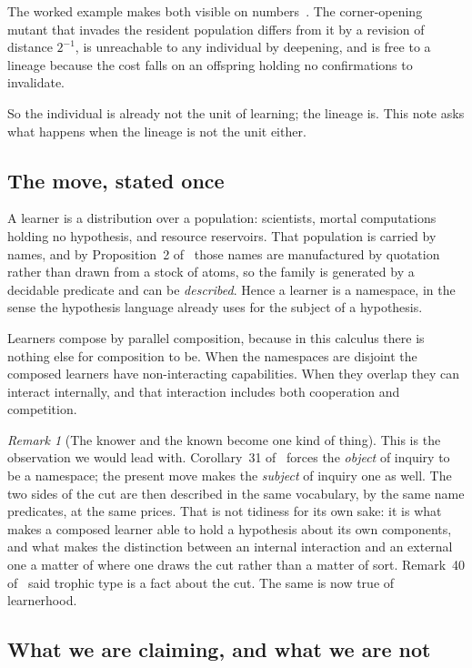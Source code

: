 \documentclass[11pt,a4paper]{article}
\theoremstyle{plain}
\theoremstyle{definition}
\theoremstyle{remark}
\newtheorem{remark}[theorem]{Remark}
\begin{document}
The worked example makes both visible on numbers~\cite[\S9]{game}. The corner-opening
mutant that invades the resident population differs from it by a revision of distance $2^{-1}$,
is unreachable to any individual by deepening, and is free to a lineage because the cost falls on
an offspring holding no confirmations to invalidate.

So the individual is already not the unit of learning; the lineage is. This note asks what happens
when the lineage is not the unit either.

\subsection{The move, stated once}

A learner is a distribution over a population: scientists, mortal computations holding no
hypothesis, and resource reservoirs. That population is carried by names, and by Proposition~2
of~\cite{game} those names are manufactured by quotation rather than drawn from a stock of
atoms, so the family is generated by a decidable predicate and can be \emph{described}. Hence a
learner is a namespace, in the sense the hypothesis language already uses for the subject of a
hypothesis.

Learners compose by parallel composition, because in this calculus there is nothing else for
composition to be. When the namespaces are disjoint the composed learners have non-interacting
capabilities. When they overlap they can interact internally, and that interaction includes both
cooperation and competition.

\begin{remark}[The knower and the known become one kind of thing]
This is the observation we would lead with. Corollary~31 of~\cite{scientist} forces the
\emph{object} of inquiry to be a namespace; the present move makes the \emph{subject} of inquiry
one as well. The two sides of the cut are then described in the same vocabulary, by the same name
predicates, at the same prices. That is not tidiness for its own sake: it is what makes a
composed learner able to hold a hypothesis about its own components, and what makes the
distinction between an internal interaction and an external one a matter of where one draws the
cut rather than a matter of sort. Remark~40 of~\cite{scientist} said trophic type is a fact about
the cut. The same is now true of learnerhood.
\end{remark}

\subsection{What we are claiming, and what we are not}
\end{document}
